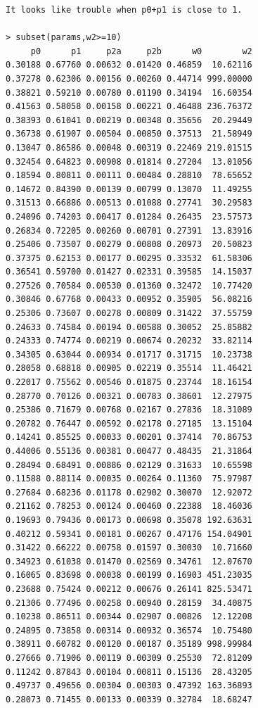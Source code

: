 \documentclass[12pt,letterpaper]{article}\usepackage[]{graphicx}\usepackage[]{color}
\begin{document}
\clearpage

\begin{lstlisting}
It looks like trouble when p0+p1 is close to 1.

> subset(params,w2>=10)
     p0      p1     p2a     p2b      w0        w2
0.30188 0.67760 0.00632 0.01420 0.46859  10.62116
0.37278 0.62306 0.00156 0.00260 0.44714 999.00000
0.38821 0.59210 0.00780 0.01190 0.34194  16.60354
0.41563 0.58058 0.00158 0.00221 0.46488 236.76372
0.38393 0.61041 0.00219 0.00348 0.35656  20.29449
0.36738 0.61907 0.00504 0.00850 0.37513  21.58949
0.13047 0.86586 0.00048 0.00319 0.22469 219.01515
0.32454 0.64823 0.00908 0.01814 0.27204  13.01056
0.18594 0.80811 0.00111 0.00484 0.28810  78.65652
0.14672 0.84390 0.00139 0.00799 0.13070  11.49255
0.31513 0.66886 0.00513 0.01088 0.27741  30.29583
0.24096 0.74203 0.00417 0.01284 0.26435  23.57573
0.26834 0.72205 0.00260 0.00701 0.27391  13.83916
0.25406 0.73507 0.00279 0.00808 0.20973  20.50823
0.37375 0.62153 0.00177 0.00295 0.33532  61.58306
0.36541 0.59700 0.01427 0.02331 0.39585  14.15037
0.27526 0.70584 0.00530 0.01360 0.32472  10.77420
0.30846 0.67768 0.00433 0.00952 0.35905  56.08216
0.25306 0.73607 0.00278 0.00809 0.31422  37.55759
0.24633 0.74584 0.00194 0.00588 0.30052  25.85882
0.24333 0.74774 0.00219 0.00674 0.20232  33.82114
0.34305 0.63044 0.00934 0.01717 0.31715  10.23738
0.28058 0.68818 0.00905 0.02219 0.35514  11.46421
0.22017 0.75562 0.00546 0.01875 0.23744  18.16154
0.28770 0.70126 0.00321 0.00783 0.38601  12.27975
0.25386 0.71679 0.00768 0.02167 0.27836  18.31089
0.20782 0.76447 0.00592 0.02178 0.27185  13.15104
0.14241 0.85525 0.00033 0.00201 0.37414  70.86753
0.44006 0.55136 0.00381 0.00477 0.48435  21.31864
0.28494 0.68491 0.00886 0.02129 0.31633  10.65598
0.11588 0.88114 0.00035 0.00264 0.11360  75.97987
0.27684 0.68236 0.01178 0.02902 0.30070  12.92072
0.21162 0.78253 0.00124 0.00460 0.22388  18.46036
0.19693 0.79436 0.00173 0.00698 0.35078 192.63631
0.40212 0.59341 0.00181 0.00267 0.47176 154.04901
0.31422 0.66222 0.00758 0.01597 0.30030  10.71660
0.34923 0.61038 0.01470 0.02569 0.34761  12.07670
0.16065 0.83698 0.00038 0.00199 0.16903 451.23035
0.23688 0.75424 0.00212 0.00676 0.26141 825.53471
0.21306 0.77496 0.00258 0.00940 0.28159  34.40875
0.10238 0.86511 0.00344 0.02907 0.00826  12.12208
0.24895 0.73858 0.00314 0.00932 0.36574  10.75480
0.38911 0.60782 0.00120 0.00187 0.35189 998.99984
0.27666 0.71906 0.00119 0.00309 0.25530  72.81209
0.11242 0.87843 0.00104 0.00811 0.15136  28.43205
0.49737 0.49656 0.00304 0.00303 0.47392 163.36893
0.28073 0.71455 0.00133 0.00339 0.32784  18.68247

\end{lstlisting}
\end{document}
